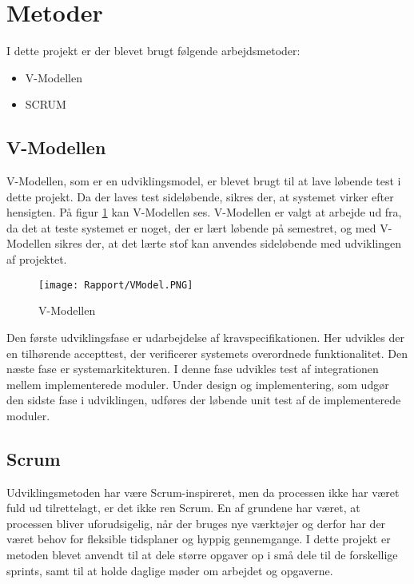 \section{Metoder}

I dette projekt er der blevet brugt følgende arbejdsmetoder:
\begin{itemize}
	\item V-Modellen
	\item SCRUM
	
\end{itemize}

\subsection{V-Modellen}

V-Modellen, som er en udviklingsmodel, er blevet brugt til at lave løbende test i dette projekt. Da der laves test sideløbende, sikres der, at systemet virker efter hensigten. På figur \ref{VModel} kan V-Modellen ses. V-Modellen er valgt at arbejde ud fra, da det at teste systemet er noget, der er lært løbende på semestret, og med V-Modellen sikres der, at det lærte stof kan anvendes sideløbende med udviklingen af projektet. 

\begin{figure}[H]
	\centering
	\texttt{[image: Rapport/VModel.PNG]}
	\caption{V-Modellen}
	\label{VModel}
\end{figure} 
Den første udviklingsfase er udarbejdelse af kravspecifikationen. Her udvikles der en tilhørende accepttest, der verificerer systemets overordnede funktionalitet. Den næste fase er systemarkitekturen.
I denne fase udvikles test af integrationen mellem implementerede moduler. Under design og implementering, som udgør den sidste fase i udviklingen, udføres der løbende unit test af de implementerede moduler.

\subsection{Scrum}
Udviklingsmetoden har være Scrum-inspireret, men da processen ikke har været fuld ud tilrettelagt, er det ikke ren Scrum. En af grundene har været, at processen bliver uforudsigelig, når der bruges nye værktøjer og derfor har der været behov for fleksible tidsplaner og hyppig gennemgange. 
\newline
\newline
I dette projekt er metoden blevet anvendt til at dele større opgaver op i små dele til de forskellige sprints, samt til at holde daglige møder om arbejdet og opgaverne. 


